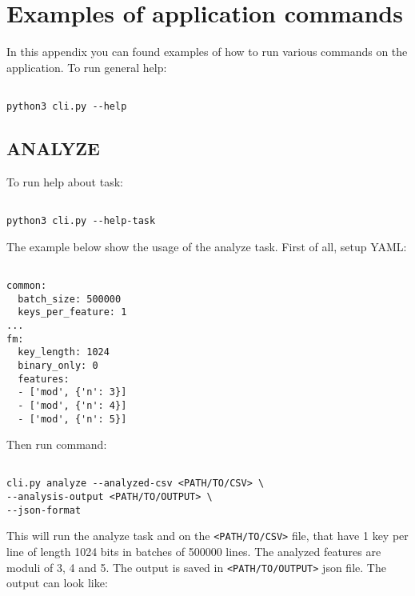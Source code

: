 \chapter{Examples of application commands}

\label{appendix-running}

In this appendix you can found examples of how to run various commands on the application. To run general help:

\begin{verbatim}

python3 cli.py --help

\end{verbatim}

\section*{ANALYZE}

To run help about task:

\begin{verbatim}

python3 cli.py --help-task

\end{verbatim}

\noindent
The example below show the usage of the analyze task. First of all, setup YAML:

\begin{verbatim}

common:
  batch_size: 500000
  keys_per_feature: 1
...  
fm:
  key_length: 1024
  binary_only: 0
  features:
  - ['mod', {'n': 3}]
  - ['mod', {'n': 4}]
  - ['mod', {'n': 5}]

\end{verbatim}

\noindent
Then run command:

\begin{verbatim}

cli.py analyze --analyzed-csv <PATH/TO/CSV> \
--analysis-output <PATH/TO/OUTPUT> \
--json-format

\end{verbatim}

\noindent
This will run the analyze task and on the \texttt{<PATH/TO/CSV>} file, that have 1 key per line of length 1024 bits in batches of 500000 lines. The analyzed features are moduli of 3, 4 and 5. The output is saved in \texttt{<PATH/TO/OUTPUT>} json file. The output can look like:

